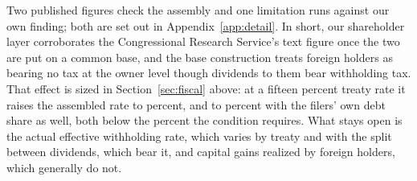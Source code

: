 Two published figures check the assembly and one limitation runs against our own finding; both are set out in Appendix~\ref{app:detail}. In short, our shareholder layer corroborates the Congressional Research Service's text figure once the two are put on a common base, and the base construction treats foreign holders as bearing no tax at the owner level though dividends to them bear withholding tax. That effect is sized in Section~\ref{sec:fiscal} above: at a fifteen percent treaty rate it raises the assembled rate to  percent, and to  percent with the filers' own debt share as well, both below the  percent the condition requires. What stays open is the actual effective withholding rate, which varies by treaty and with the split between dividends, which bear it, and capital gains realized by foreign holders, which generally do not.

